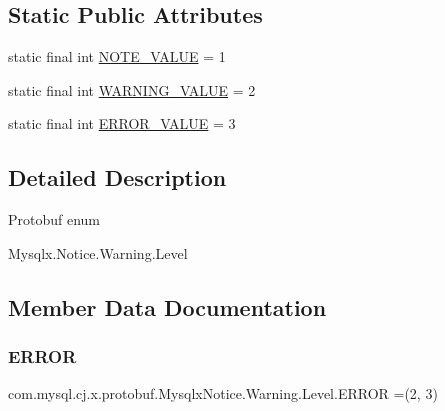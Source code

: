 \subsection*{Static Public Attributes}
\begin{DoxyCompactItemize}
\item 
static final int \mbox{\hyperlink{enumcom_1_1mysql_1_1cj_1_1x_1_1protobuf_1_1_mysqlx_notice_1_1_warning_1_1_level_a88e0dedd605ca8867bb65dee9910cc62}{N\+O\+T\+E\+\_\+\+V\+A\+L\+UE}} = 1
\item 
static final int \mbox{\hyperlink{enumcom_1_1mysql_1_1cj_1_1x_1_1protobuf_1_1_mysqlx_notice_1_1_warning_1_1_level_a0d79b3c8792db796b1f8d1384633ffa8}{W\+A\+R\+N\+I\+N\+G\+\_\+\+V\+A\+L\+UE}} = 2
\item 
static final int \mbox{\hyperlink{enumcom_1_1mysql_1_1cj_1_1x_1_1protobuf_1_1_mysqlx_notice_1_1_warning_1_1_level_a17c14cef844a02a2cfcdfd5dfc523325}{E\+R\+R\+O\+R\+\_\+\+V\+A\+L\+UE}} = 3
\end{DoxyCompactItemize}


\subsection{Detailed Description}
Protobuf enum
\begin{DoxyCode}
Mysqlx.Notice.Warning.Level 
\end{DoxyCode}
 

\subsection{Member Data Documentation}
\mbox{\label{enumcom_1_1mysql_1_1cj_1_1x_1_1protobuf_1_1_mysqlx_notice_1_1_warning_1_1_level_ad98493bcee681b36788be787714329f9}} 
\subsubsection{\texorpdfstring{E\+R\+R\+OR}{ERROR}}
{\footnotesize\ttfamily com.\+mysql.\+cj.\+x.\+protobuf.\+Mysqlx\+Notice.\+Warning.\+Level.\+E\+R\+R\+OR =(2, 3)}


